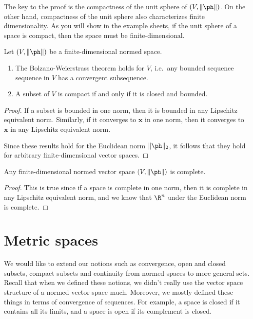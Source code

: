 \documentclass[a4paper]{article}
\begin{document}
The key to the proof is the compactness of the unit sphere of $(V, \|\ph\|)$. On the other hand, compactness of the unit sphere also characterizes finite dimensionality. As you will show in the example sheets, if the unit sphere of a space is compact, then the space must be finite-dimensional.

\begin{cor}
  Let $(V, \|\ph\|)$ be a finite-dimensional normed space.
  \begin{enumerate}
    \item The Bolzano-Weierstrass theorem holds for $V$, i.e.\ any bounded sequence sequence in $V$ has a convergent subsequence.
    \item A subset of $V$ is compact if and only if it is closed and bounded.
  \end{enumerate}
\end{cor}

\begin{proof}
  If a subset is bounded in one norm, then it is bounded in any Lipschitz equivalent norm. Similarly, if it converges to $\mathbf{x}$ in one norm, then it converges to $\mathbf{x}$ in any Lipschitz equivalent norm.

  Since these results hold for the Euclidean norm $\|\ph\|_2$, it follows that they hold for arbitrary finite-dimensional vector spaces.
\end{proof}

\begin{cor}
  Any finite-dimensional normed vector space $(V, \|\ph\|)$ is complete.
\end{cor}

\begin{proof}
  This is true since if a space is complete in one norm, then it is complete in any Lipschitz equivalent norm, and we know that $\R^n$ under the Euclidean norm is complete.
\end{proof}

\section{Metric spaces}
We would like to extend our notions such as convergence, open and closed subsets, compact subsets and continuity from normed spaces to more general sets. Recall that when we defined these notions, we didn't really use the vector space structure of a normed vector space much. Moreover, we mostly defined these things in terms of convergence of sequences. For example, a space is closed if it contains all its limits, and a space is open if its complement is closed.
\end{document}
